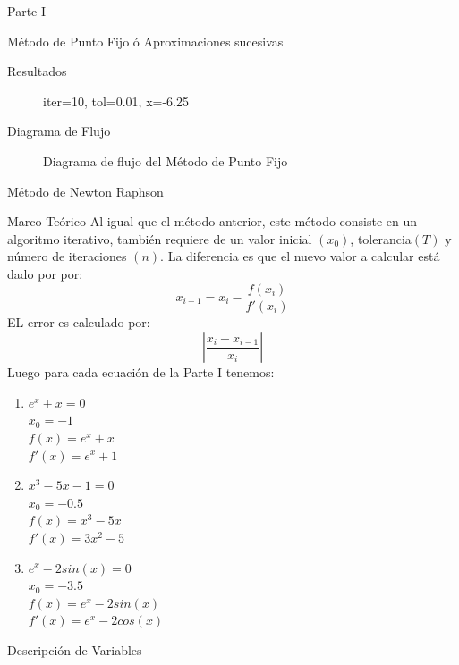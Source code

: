 \documentclass[legalpaper, 12pt]{article}
\def \eqa {\(e^x + x = 0\)}
\def \eqb {\(x^3 - 5x - 1 = 0\)}
\def \eqc {\(e^x - 2sin(x) = 0\)}
\begin{document}
\begin{section}{Parte I}
\begin{subsection}{Método de Punto Fijo ó Aproximaciones sucesivas}
\begin{subsubsection}{Resultados}
\begin{enumerate}
\begin{figure}[h]
            \caption{iter=10, tol=0.01, x=-6.25}
          \end{figure}
        \end{enumerate}
      \end{subsubsection}
      \newpage
      \begin{subsubsection}{Diagrama de Flujo}
        \begin{figure}[h]
          \centering
          
          \caption{Diagrama de flujo del Método de Punto Fijo}
        \end{figure}
      \end{subsubsection}
      \break
    \end{subsection}
    \newpage
    \begin{subsection}{Método de Newton Raphson}
      \begin{subsubsection}{Marco Teórico}
        Al igual que el método anterior, este método consiste en un algoritmo iterativo, también requiere de un valor inicial $(x_0)$, tolerancia$(T)$ y número de iteraciones $(n)$. La diferencia es que el nuevo valor a calcular está dado por por:
        \[x_{i+1} = x_i - \frac{f(x_i)}{f'(x_i)}\]
        EL error es calculado por:
        \[\left|\frac{x_i-x_{i-1}}{x_i}\right|\]
        Luego para cada ecuación de la Parte I tenemos:
        \begin{enumerate}
          \item \eqa\\$x_0=-1$\\
          $f(x) = e^x+x$\\
          $f'(x) = e^x+1$
          \item \eqb\\$x_0=-0.5$\\
          $f(x) = x^3-5x$\\
          $f'(x) = 3x^2-5$
          \item \eqc\\$x_0=-3.5$\\
          $f(x) = e^x-2sin(x)$\\
          $f'(x) = e^x-2cos(x)$
        \end{enumerate}
      \end{subsubsection}
      \begin{subsubsection}{Descripción de Variables}
        \begin{table}[h]
          \centering
          \begin{tabular}{|c c c|}
            \hline

\end{tabular}
\end{table}
\end{subsubsection}
\end{subsection}
\end{section}
\end{document}
